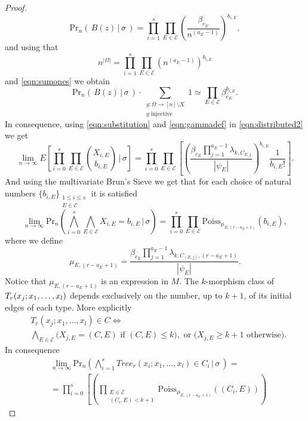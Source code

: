\documentclass[11pt,notitlepage,a4paper]{article}
\theoremstyle{definition}
\newcommand{\Ln}{\lim\limits_{n\to \infty}}
\begin{document}
\begin{proof}
 	\[ \mathrm{Pr}_n(\, B(z) \, | \, \sigma \, ) = \prod_{i=1}^{s} 
 	\prod_{E\in \mathcal{E}} \left(\frac{\beta_{c_E}}{n^{(a_E -1)}}
 	\right)^{b_{i,E}},  \]
 	and using that
 	\[  n^{|\Omega|}= \prod_{i=1}^{s} 
 	\prod_{E\in \mathcal{E}} (n^{(a_E-1)})^{b_{i,E}}  \]
 	and \cref{eqn:sumones} we obtain 
 	\begin{equation} \label{eqn:substitution}
 	\mathrm{Pr}_n(\, B(z) \, | \, \sigma \, )\cdot \sum_{\substack{y:
 	\Omega \rightarrow [n]\setminus X\\ y \text{ injective}}} 1 \simeq 	
 	\prod_{E\in \mathcal{E}} \beta_{c_E}^{b_{i,E}}. 
 	\end{equation}
 	In consequence, using \cref{eqn:substitution} and \cref{eqn:gammadef} in
 	\cref{eqn:distributed2} we get
 	\[ \Ln E\left[\prod_{i=0}^{s}\prod_{E\in \mathcal{E}}
 	\binom{X_{i,E}}{b_{i,E}} \, \Bigg| \, \sigma \right]= \prod_{i=0}^{s}\prod_{E\in \mathcal{E}}
 	\left[ 	\left(\frac{\beta_{c_E} \prod_{j=1}^{a_E -1} \lambda_{k,C_{E,j}} }{|\psi_E|}\right)^{b_{i,E}} \frac{1}{b_{i,E}!} \right]. \]
 	And using the multivariate Brun's Sieve we get that for each
 	choice of natural numbers $\{b_{i,E}\}_{\substack{1\leq i \leq s\\ 
 	E\in \mathcal{E}}}$ it is satisfied
 	\[ \Ln \mathrm{Pr}_n\left(\bigwedge_{i=0}^{s}\bigwedge_{E\in \mathcal{E}} X_{i,E}=b_{i,E} \, \Bigg| \, \sigma \right) = 
 	\prod_{i=0}^{s}\prod_{E\in \mathcal{E}}
 	\mathrm{Poiss}_{\mu_{E,(r-a_E+1)}}(b_{i,E}),\]
 	where we define
 	\[\mu_{E,(r-a_E+1)}=
 	\frac{\beta_{c_E} \prod_{j=1}^{a_E -1} \lambda_{k,C_{(E,j)},(r-a_E+1)} }{|\psi_E|}.\]
 	Notice that $\mu_{E,(r-a_E+1)}$ is an expression in $M$.
 	The $k$-morphism class of $\\T_r(x_j;x_1, \dots, x_l)$ depends exclusively
 	on the number, up to $k+1$, of its initial edges of each type.
 	More explicitly
 	\begin{align*}
 	&T_r(x_j;x_1, \dots, x_l)\in C \iff \\
 	& \bigwedge_{E\in \mathcal{E}}
 	\big(X_{j, E}= (C,E) \text{  if  } (C,E)\leq k \big),
 	\text{  or  }  \big(X_{j, E}\geq k+1 \text{ otherwise}\big). 
 	\end{align*}
 	In consequence 
 	\begin{align*}
 	&\Ln \mathrm{Pr}_n(\bigwedge_{i=1}^s Tree_r(x_i; x_1, \dots, x_l)\in C_i \, | 
 	\, \sigma \,)=\\ 
 	&=\prod_{i=0}^{s}\left[
 	\left(\prod_{\substack{E\in \mathcal{E}\\ (C_i,E)<k+1}} \mathrm{Poiss}_{\mu_{E,(r-a_E+1)}}((C_i,E))\right)

\end{align*}
\end{proof}
\end{document}
